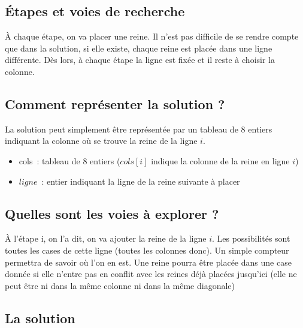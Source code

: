 	\subsection{Étapes et voies de recherche}

	À chaque étape, on va placer une reine. Il n'est pas difficile 
	de se rendre compte que dans la solution, si elle existe,
	chaque reine est placée dans une ligne différente. Dès lors, 
	à chaque étape la ligne est fixée et il reste à choisir la
	colonne.

	\subsection{Comment représenter la solution ?}

		La solution peut simplement être représentée par un tableau 
		de 8 entiers indiquant la colonne où se trouve la reine de
		la ligne $i$.

		\begin{itemize}
			\item {
				cols~: tableau de 8 entiers ($cols[i]$ indique 
				la colonne de la reine en ligne $i$)}
			\item {
				$ligne$~: entier indiquant la ligne de la reine suivante à placer}
		\end{itemize}
		
	\subsection{Quelles sont les voies à explorer ?}

		À l'étape i, on l'a dit, on va ajouter la reine de la ligne $i$. 
		Les possibilités sont toutes les cases de cette ligne
		(toutes les colonnes donc). Un simple compteur permettra de 
		savoir où l'on en est. Une reine pourra être placée dans une
		case donnée si elle n'entre pas en conflit avec les reines 
		déjà placées jusqu'ici (elle ne peut être ni dans la même
		colonne ni dans la même diagonale)

	\subsection{La solution}

		
